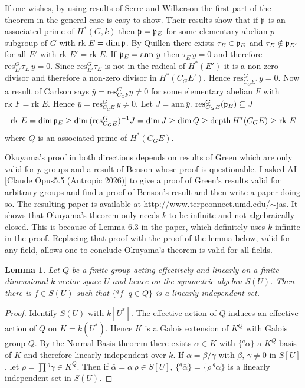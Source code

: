 \documentclass[reqno]{amsart}
\theoremstyle{plain}%
\newtheorem{lemma}[thm]{Lemma}
\theoremstyle{definition}
\theoremstyle{remark}
\newcommand\sub{\subseteq}
\newcommand\dph{\text{depth}\,}
\newcommand\rk{\text{rk }}
\newcommand\an{\text{ann}\,}
\newcommand\res[2]{\text{res}^{#1}_{#2}}
\begin{document}
If one wishes, by using results of Serre and Wilkerson \cite{W} the first part of the theorem in the general case is easy to show.  Their results show that if $\frak p$ is an associated prime of $H^*(G,k)$ then $\frak p=\frak p_E$ for some elementary abelian $p$-subgroup of $G$ with $\rk E=\dim \frak p$.  By Quillen \cite{Q} there exists $\tau_E\in \frak p_E$ and $\tau_E\notin \frak p_{E'}$ for all $E'$ with $\rk E'=\rk E$. If $\frak p_E=\an\,y$ then $\tau_E\,y=0$ and therefore $\res G{E'}\tau_E\,y=0$.
Since $\res G{E'}\tau_E$ is not in the radical of $H^*(E')$ it is a non-zero divisor and therefore a non-zero divisor in $H^*(C_GE')$.  Hence $\res G{C_GE'}\,y=0$. Now a result of Carlson \cite{C} says $\bar y=\res G{C_GF}y\neq 0$ for some elementary abelian $F$ with $\rk F=\rk E$. Hence $\bar y=\res G{C_GE}\,y\neq 0$. Let $J=\an \bar y$. $\res G{C_GE}(\frak p_E)\sub J$ 
$$\rk E=\dim\frak p_E\geq\dim\,(\res G{C_GE})^{-1}J=\dim J \geq\dim Q\geq\dph H^*(C_GE)\geq \rk E$$
where $Q$ is an associated prime of $H^*(C_GE)$. 

Okuyama's proof in both directions depends on results of Green \cite{G} which are only valid for $p$-groups and a result of Benson \cite{B1} whose proof is questionable.  I asked AI [Claude Opus5.5 (Antropic 2026)] to give a proof of Green's results valid for arbitrary groups and find a proof of Benson's result and then write a paper doing so. The resulting paper is available at http://www.terpconnect.umd.edu/$\sim$jas.  It shows that Okuyama's theorem only needs $k$ to be infinite and not algebraically closed.  This is because of Lemma 6.3 in the paper, which definitely uses $k$ infinite in the proof. Replacing that proof with the proof of the lemma below, valid for any field, allows one to conclude Okuyama's theorem is valid for all fields.

\begin{lemma} Let $Q$ be a finite group acting effectively and linearly on a finite dimensional $k$-vector space $U$ and hence on the symmetric algebra $S(U)$. Then there is $f\in S(U)$ such that $\{{}^qf\,\vert\, q\in Q\}$ is a linearly independent set.\end{lemma}
\begin{proof} Identify $S(U)$ with $k[U^*]$.  The effective action of $Q$ induces an effective action of $Q$ on $K=k(U^*)$. Hence $K$ is a Galois extension of $K^Q$ with Galois group $Q$.  By the Normal Basis theorem there exists $\alpha\in K$ with $\{{}^q \alpha\}$ a $K^Q$-basis of $K$ and therefore linearly independent over $k$.  If $\alpha=\beta/\gamma$ with $\beta,\,\gamma\neq 0$ in $S[U]$, let $\rho=\prod{}^q\gamma\in K^Q$.  Then if  
$\bar\alpha=\alpha\,\rho\in S[U]$, $\{{}^q\bar\alpha\}=\{\rho\,{}^q\alpha\}$ is a linearly independent set in $S(U)$.\end{proof}
\end{document}
